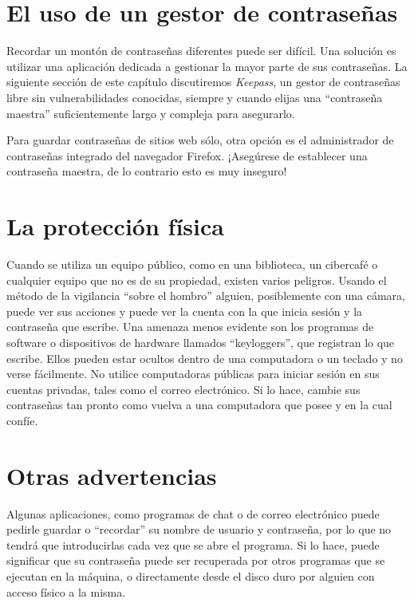 \documentclass[10pt,a5paper,twoside,,]{book}
\begin{document}
\section{El uso de un gestor de
contraseñas}\label{el-uso-de-un-gestor-de-contraseuxf1as}

Recordar un montón de contraseñas diferentes puede ser difícil. Una
solución es utilizar una aplicación dedicada a gestionar la mayor parte
de sus contraseñas. La siguiente sección de este capítulo discutiremos
\emph{Keepass}, un gestor de contraseñas libre sin vulnerabilidades
conocidas, siempre y cuando elijas una ``contraseña maestra''
suficientemente largo y compleja para asegurarlo.

Para guardar contraseñas de sitios web sólo, otra opción es el
administrador de contraseñas integrado del navegador Firefox. ¡Asegúrese
de establecer una contraseña maestra, de lo contrario esto es muy
inseguro!

\section{La protección física}\label{la-protecciuxf3n-fuxedsica}

Cuando se utiliza un equipo público, como en una biblioteca, un
cibercafé o cualquier equipo que no es de su propiedad, existen varios
peligros. Usando el método de la vigilancia ``sobre el hombro'' alguien,
posiblemente con una cámara, puede ver sus acciones y puede ver la
cuenta con la que inicia sesión y la contraseña que escribe. Una amenaza
menos evidente son los programas de software o dispositivos de hardware
llamados ``keyloggers'', que registran lo que escribe. Ellos pueden
estar ocultos dentro de una computadora o un teclado y no verse
fácilmente. No utilice computadoras públicas para iniciar sesión en sus
cuentas privadas, tales como el correo electrónico. Si lo hace, cambie
sus contraseñas tan pronto como vuelva a una computadora que posee y en
la cual confíe.

\section{Otras advertencias}\label{otras-advertencias}

Algunas aplicaciones, como programas de chat o de correo electrónico
puede pedirle guardar o ``recordar'' su nombre de usuario y contraseña,
por lo que no tendrá que introducirlas cada vez que se abre el programa.
Si lo hace, puede significar que su contraseña puede ser recuperada por
otros programas que se ejecutan en la máquina, o directamente desde el
disco duro por alguien con acceso físico a la misma.
\end{document}
